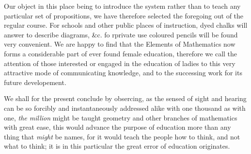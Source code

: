     Our object in this place being to introduce the system rather than to teach any particular set of propositions, we have therefore selected the foregoing out of the regular course. For schools and other public places of instruction, dyed chalks will answer to describe diagrams, \&c. fo rprivate use coloured pencils will be found very convenient.
    We are happy to find that the Elements of Mathematics now forms a considerable part of ever found female education, therefore we call the attention of those interested or engaged in the education of ladies to this very attractive mode of communicating knowledge, and to the successing work for its future developement. 

    We shall for the present conclude by obsercing, as the sensed of sight and hearing can be so forcibly and instantaneously addressed alike with one thousand as with one, \textit{the million} might be taught geometry and other branches of mathematics with great ease, this would advance the purpose of education more than any thing that \textit{might} be names, for it would teach the people how to think, and not what to think; it is in this particular the great error of education originates.



 
